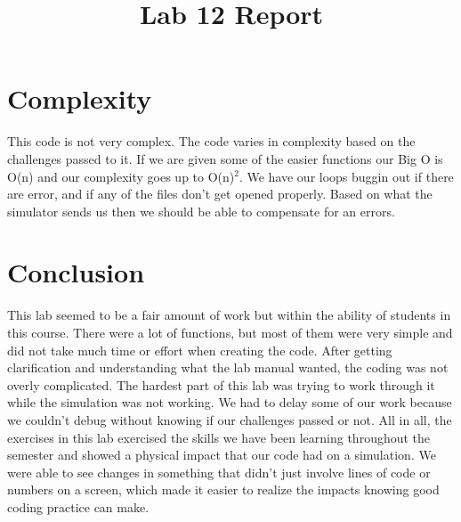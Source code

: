 \documentclass{article} \usepackage[utf8]{inputenc} \title{Lab 12 Report}
\begin{document}
\section*{Complexity} This code is not very complex. The code varies in 
complexity based on the challenges passed to it. If we are given some of 
the easier functions our Big O is O(n) and our complexity goes up to 
O(n)$^2$. We have our loops buggin out if there are error, and if any of 
the files don't get opened properly. Based on what the simulator sends us 
then we should be able to compensate for an errors. \section*{Conclusion} 
This lab seemed to be a fair amount of work but within the ability of 
students in this course. There were a lot of functions, but most of them 
were very simple and did not take much time or effort when creating the 
code. After getting clarification and understanding what the lab manual 
wanted, the coding was not overly complicated. The hardest part of this 
lab was trying to work through it while the simulation was not working. We 
had to delay some of our work because we couldn't debug without knowing if 
our challenges passed or not. All in all, the exercises in this lab 
exercised the skills we have been learning throughout the semester and 
showed a physical impact that our code had on a simulation. We were able 
to see changes in something that didn't just involve lines of code or 
numbers on a screen, which made it easier to realize the impacts knowing 
good coding practice can make. 
\end{document}
